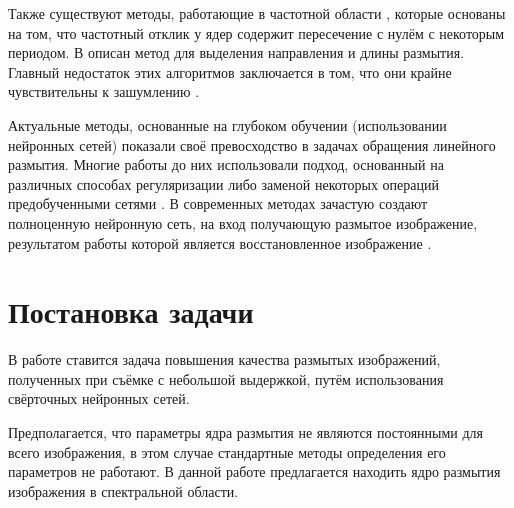 Также существуют методы, работающие в частотной области \cite{rom, cannon}, которые основаны на том, что частотный отклик у ядер содержит пересечение с нулём с некоторым периодом. В \cite{lokh} описан метод для выделения направления и длины размытия. Главный недостаток этих алгоритмов заключается в том, что они крайне чувствительны к зашумлению \cite{kundur}.
\par
Актуальные методы, основанные на глубоком обучении (использовании нейронных сетей) показали своё превосходство в задачах обращения линейного размытия. Многие работы до них использовали подход, основанный на различных способах регуляризации либо заменой некоторых операций предобученными сетями \cite{shuler, sun}. В современных методах зачастую создают полноценную нейронную сеть, на вход получающую размытое изображение, результатом работы которой является восстановленное изображение \cite{nah, tao}. 

\newpage
\section{Постановка задачи}
В работе ставится задача повышения качества размытых изображений, полученных при съёмке с небольшой выдержкой, путём использования свёрточных нейронных сетей.

Предполагается, что параметры ядра размытия не являются постоянными для всего изображения, в этом случае стандартные методы определения его параметров не работают. В данной работе предлагается находить ядро размытия изображения в спектральной области. 
\par

